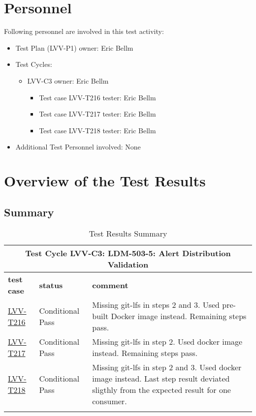 \documentclass[DM,lsstdraft,STR,toc]{lsstdoc}
\begin{document}
\section{Personnel}
\label{sect:personnel}

Following personnel are involved in this test activity:

\begin{itemize}
\item Test Plan (LVV-P1) owner: Eric Bellm
\item Test Cycles:
\begin{itemize}
  \item LVV-C3 owner: 
    Eric Bellm
  \begin{itemize}
    \item Test case LVV-T216 tester: Eric Bellm
    \item Test case LVV-T217 tester: Eric Bellm
    \item Test case LVV-T218 tester: Eric Bellm
  \end{itemize}
\end{itemize}
\item Additional Test Personnel involved: None
\end{itemize}

\newpage

\section{Overview of the Test Results}
\label{sect:overview}

\subsection{Summary}
\label{sect:summarytable}

\begin{longtable} {p{}p{}p{}}
\toprule
  \multicolumn{3}{c}{ Test Cycle {\bf LVV-C3: LDM-503-5: Alert Distribution Validation }} \\\hline
  {\bf \footnotesize test case} & {\bf \footnotesize status} & {\bf \footnotesize comment} \\\toprule
    \href{https://jira.lsstcorp.org/secure/Tests.jspa#/testCase/LVV-T216}{LVV-T216} 
    & Conditional Pass & Missing git-lfs in steps 2 and 3. Used pre-built Docker image instead.
Remaining steps pass.

    \\\hline
    \href{https://jira.lsstcorp.org/secure/Tests.jspa#/testCase/LVV-T217}{LVV-T217} 
    & Conditional Pass & Missing git-lfs in step 2. Used docker image instead. Remaining steps
pass.

    \\\hline
    \href{https://jira.lsstcorp.org/secure/Tests.jspa#/testCase/LVV-T218}{LVV-T218} 
    & Conditional Pass & Missing git-lfs in step 2 and 3. Used docker image instead. Last step
result deviated sligthly from the expected result for one consumer.

    \\\hline

\caption{Test Results Summary}
\label{table:summary}
\end{longtable}
\end{document}
